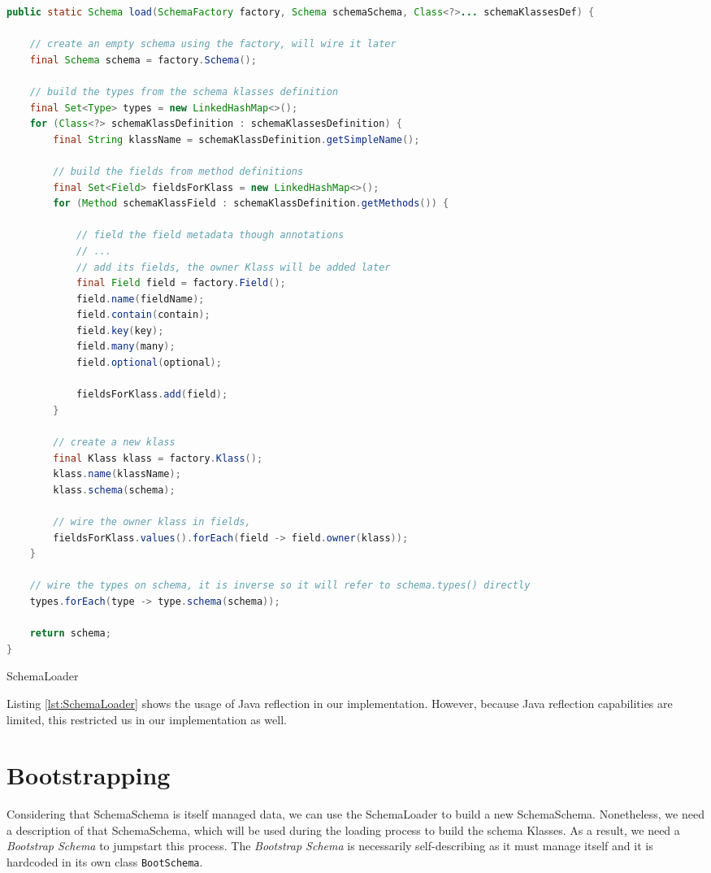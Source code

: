 \begin{sourcecode} [H]
	\begin{lstlisting}[language=Java, escapechar=|]
public static Schema load(SchemaFactory factory, Schema schemaSchema, Class<?>... schemaKlassesDef) {

	// create an empty schema using the factory, will wire it later
	final Schema schema = factory.Schema();

	// build the types from the schema klasses definition
	final Set<Type> types = new LinkedHashMap<>();
	for (Class<?> schemaKlassDefinition : schemaKlassesDefinition) {
		final String klassName = schemaKlassDefinition.getSimpleName();

		// build the fields from method definitions
		final Set<Field> fieldsForKlass = new LinkedHashMap<>();
		for (Method schemaKlassField : schemaKlassDefinition.getMethods()) {

			// field the field metadata though annotations
			// ...
			// add its fields, the owner Klass will be added later
            final Field field = factory.Field();
            field.name(fieldName);
            field.contain(contain);
            field.key(key);
            field.many(many);
            field.optional(optional);

            fieldsForKlass.add(field);
		}
    
		// create a new klass
		final Klass klass = factory.Klass();
		klass.name(klassName);
		klass.schema(schema);

		// wire the owner klass in fields,
		fieldsForKlass.values().forEach(field -> field.owner(klass));
	}

	// wire the types on schema, it is inverse so it will refer to schema.types() directly
	types.forEach(type -> type.schema(schema));

	return schema;
}
	\end{lstlisting}
	\caption{SchemaLoader}
	\label{lst:SchemaLoader}
\end{sourcecode}

Listing \ref{lst:SchemaLoader} shows the usage of Java reflection in our implementation.
However, because Java reflection capabilities are limited, this restricted us in our implementation as well.

\section{Bootstrapping}\label{sec:Bootstrapping}
Considering that SchemaSchema is itself managed data, we can use the SchemaLoader to build a new SchemaSchema.
Nonetheless, we need a description of that SchemaSchema, which will be used during the loading process to build the schema Klasses.
As a result, we need a \textit{Bootstrap Schema} to jumpstart this process.
The \textit{Bootstrap Schema} is necessarily self-describing as it must manage itself \cite{loh2012managed} and it is hardcoded in its own class \texttt{BootSchema}.

